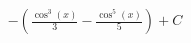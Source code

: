 \documentclass[preview]{standalone}
\begin{document}
\begin{align*}
- \left( \frac{\cos^3(x)}{3} - \frac{\cos^5(x)}{5} \right) + C
\end{align*}
\end{document}
